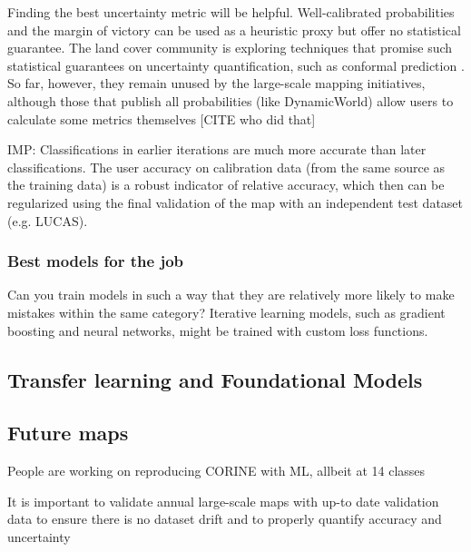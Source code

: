             Finding the best uncertainty metric will be helpful. Well-calibrated probabilities and the margin of victory \citep{calderon-loor2021high} can be used as a heuristic proxy but offer no statistical guarantee. The land cover community is exploring techniques that promise such statistical guarantees on uncertainty quantification, such as conformal prediction \citep{angelopoulos2023predictionpowered,valle2023quantifying,singh2024uncertainty}. So far, however, they remain unused by the large-scale mapping initiatives, although those that publish all probabilities (like DynamicWorld) allow users to calculate some metrics themselves [CITE who did that]
        
            IMP: Classifications in earlier iterations are much more accurate than later classifications. The user accuracy on calibration data (from the same source as the training data) is a robust indicator of relative accuracy, which then can be regularized using the final validation of the map with an independent test dataset (e.g. LUCAS).
    
        \subsubsection{Best models for the job}
                Can you train models in such a way that they are relatively more likely to make mistakes within the same category? Iterative learning models, such as gradient boosting and neural networks, might be trained with custom loss functions.

    \subsection{Transfer learning and Foundational Models}
    
    
    
    
    \subsection{Future maps}
    
        People are working on reproducing CORINE with ML, allbeit at 14 classes \citep{bhugra2022rapidai4eo}
        
        It is important to validate annual large-scale maps with up-to date validation data to ensure there is no dataset drift and to properly quantify accuracy and uncertainty \citep{tsendbazar2021towards}
    
    
            
                
            



        

